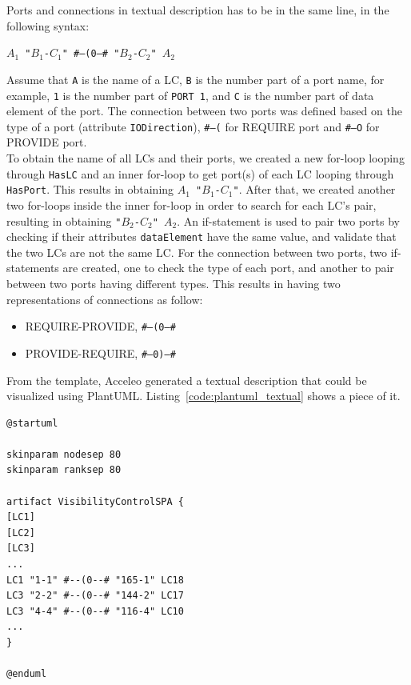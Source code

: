 Ports and connections in textual description has to be in the same line, in the following syntax:\\
\begin{center}
\texttt{$A_1$ "$B_1$-$C_1$" \#--(0--\# "$B_2$-$C_2$" $A_2$}
\end{center}
\vspace{1em}
Assume that \texttt{A} is the name of a LC, \texttt{B} is the number part of a port name, for example, \texttt{1} is the number part of \texttt{PORT 1}, and \texttt{C} is the number part of data element of the port. The connection between two ports was defined based on the type of a port (attribute \texttt{IODirection}), \texttt{\#--(} for REQUIRE port and \texttt{\#--O} for PROVIDE port. \\

To obtain the name of all LCs and their ports, we created a new for-loop looping through \texttt{HasLC} and an inner for-loop to get port(s) of each LC looping through \texttt{HasPort}. This results in obtaining \texttt{$A_1$ "$B_1$-$C_1$"}. After that, we created another two for-loops inside the inner for-loop in order to search for each LC's pair, resulting in obtaining \texttt{"$B_2$-$C_2$" $A_2$}. An if-statement is used to pair two ports by checking if their attributes \texttt{dataElement} have the same value, and validate that the two LCs are not the same LC. For the connection between two ports, two if-statements are created, one to check the type of each port, and another to pair between two ports having different types. This results in having two representations of connections as follow:
\vspace{0.5em}
\begin{itemize}
    \item REQUIRE-PROVIDE, \texttt{\#--(0--\#}
    \item PROVIDE-REQUIRE, \texttt{\#--0)--\#}
\end{itemize}
\vspace{1em}
From the template, Acceleo generated a textual description that could be visualized using PlantUML. Listing~\ref{code:plantuml_textual} shows a piece of it.

\begin{lstlisting}[caption=A piece of textual representation generated from Acceleo template engine,label=code:plantuml_textual]
@startuml

skinparam nodesep 80
skinparam ranksep 80

artifact VisibilityControlSPA {
[LC1]
[LC2]
[LC3]
...
LC1 "1-1" #--(0--# "165-1" LC18
LC3 "2-2" #--(0--# "144-2" LC17
LC3 "4-4" #--(0--# "116-4" LC10
...
}

@enduml
\end{lstlisting}


